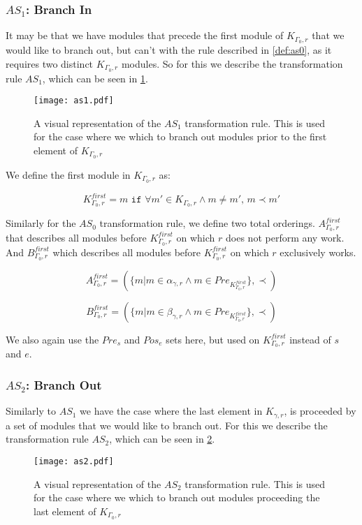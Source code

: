\subsubsection{$AS_1$: Branch In}\label{sssec:bi}
It may be that we have modules that precede the first module of $K_{\Gamma_0 ,r}$ that we would like to branch out, but can't with the rule described in \cref{def:as0}, as it requires two distinct $K_{\Gamma_0 ,r}$ modules. So for this we describe the transformation rule $AS_1$, which can be seen in \cref{fig:as1}.

\begin{figure}[H]
	\centering
	\texttt{[image: as1.pdf]}
	\caption{A visual representation of the $AS_1$ transformation rule. This is used for the case where we which to branch out modules prior to the first element of $K_{\Gamma_0 ,r}$}
	\label{fig:as1}
\end{figure}


 We define the first module in $K_{\Gamma_0 ,r}$ as:

\[K_{\Gamma_0 ,r}^{first} = m \texttt{ if } \forall m' \in K_{\Gamma_0 ,r} \land m \neq m',\, m \prec m' \] 

Similarly for the $AS_0$ transformation rule, we define two total orderings. $A_{\Gamma_0 ,r}^{first}$ that describes all modules before $K_{\Gamma_0 ,r}^{first}$ on which $r$ does not perform any work. And $B_{\Gamma_0 ,r}^{first}$ which describes all modules before $K_{\Gamma_0 ,r}^{first}$ on which $r$ exclusively works.

\[ A_{\Gamma_0 ,r}^{first} = (\{m | m \in \alpha_{\gamma ,r}  \land m \in Pre_{K_{\Gamma_0 ,r}^{first}} \}, \prec) \]

\[ B_{\Gamma_0 ,r}^{first} = (\{m | m \in \beta_{\gamma ,r}  \land m \in Pre_{K_{\Gamma_0 ,r}^{first}} \}, \prec) \]

We also again use the $Pre_s$ and $Pos_e$ sets here, but used on $K_{\Gamma_0 ,r}^{first}$ instead of $s$ and $e$.
  

\subsubsection{$AS_2$: Branch Out}
Similarly to $AS_1$ we have the case where the last element in $K_{\gamma ,r}$, is proceeded by a set of modules that we would like to branch out. For this we describe the transformation rule $AS_2$, which can be seen in \cref{fig:as2}.

\begin{figure}[H]
	\centering
	\texttt{[image: as2.pdf]}
	\caption{A visual representation of the $AS_2$ transformation rule. This is used for the case where we which to branch out modules proceeding the last element of $K_{\Gamma_0 ,r}$}
	\label{fig:as2}
\end{figure}


